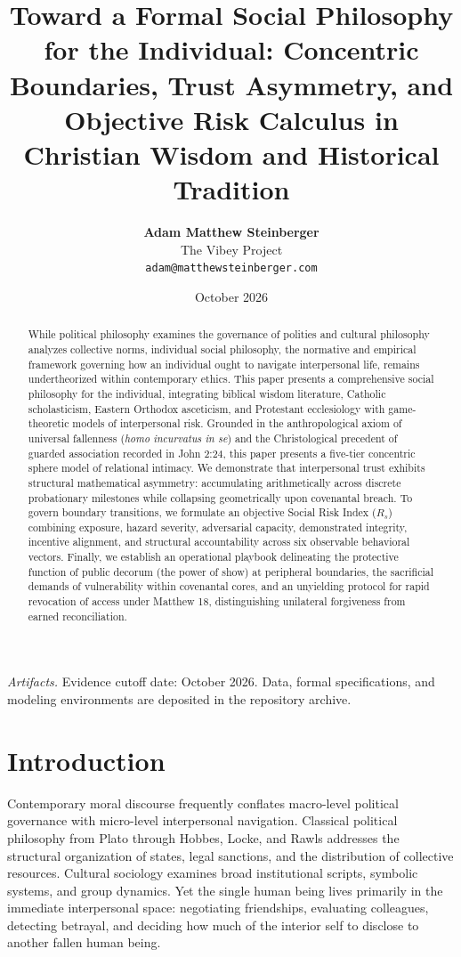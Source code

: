 \documentclass[11pt,twocolumn]{article}
\title{\textbf{Toward a Formal Social Philosophy for the Individual: Concentric Boundaries, Trust Asymmetry, and Objective Risk Calculus in Christian Wisdom and Historical Tradition}}
\author{\textbf{Adam Matthew Steinberger}\\
The Vibey Project\\
\texttt{adam@matthewsteinberger.com}}
\date{October 2026}
\begin{document}
\maketitle

\begin{abstract}
While political philosophy examines the governance of polities and cultural philosophy analyzes collective norms, individual social philosophy, the normative and empirical framework governing how an individual ought to navigate interpersonal life, remains undertheorized within contemporary ethics. This paper presents a comprehensive social philosophy for the individual, integrating biblical wisdom literature, Catholic scholasticism, Eastern Orthodox asceticism, and Protestant ecclesiology with game-theoretic models of interpersonal risk. Grounded in the anthropological axiom of universal fallenness (\textit{homo incurvatus in se}) and the Christological precedent of guarded association recorded in John 2:24, this paper presents a five-tier concentric sphere model of relational intimacy. We demonstrate that interpersonal trust exhibits structural mathematical asymmetry: accumulating arithmetically across discrete probationary milestones while collapsing geometrically upon covenantal breach. To govern boundary transitions, we formulate an objective Social Risk Index ($R_s$) combining exposure, hazard severity, adversarial capacity, demonstrated integrity, incentive alignment, and structural accountability across six observable behavioral vectors. Finally, we establish an operational playbook delineating the protective function of public decorum (the power of show) at peripheral boundaries, the sacrificial demands of vulnerability within covenantal cores, and an unyielding protocol for rapid revocation of access under Matthew 18, distinguishing unilateral forgiveness from earned reconciliation.
\end{abstract}

\noindent\textit{Artifacts.} Evidence cutoff date: October 2026. Data, formal specifications, and modeling environments are deposited in the repository archive.

\section{Introduction}
Contemporary moral discourse frequently conflates macro-level political governance with micro-level interpersonal navigation. Classical political philosophy from Plato through Hobbes, Locke, and Rawls addresses the structural organization of states, legal sanctions, and the distribution of collective resources. Cultural sociology examines broad institutional scripts, symbolic systems, and group dynamics. Yet the single human being lives primarily in the immediate interpersonal space: negotiating friendships, evaluating colleagues, detecting betrayal, and deciding how much of the interior self to disclose to another fallen human being.
\end{document}

